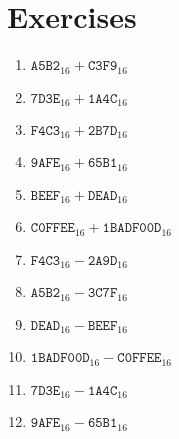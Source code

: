 \documentclass[11pt,a4paper]{article}
\theoremstyle{definition}
\theoremstyle{remark}
\begin{document}
\section{Exercises}
\begin{enumerate}
	\item $\texttt{A5B2}_{16} + \texttt{C3F9}_{16}$
	\item $\texttt{7D3E}_{16} + \texttt{1A4C}_{16}$
	\item $\texttt{F4C3}_{16} + \texttt{2B7D}_{16}$
	\item $\texttt{9AFE}_{16} + \texttt{65B1}_{16}$
	\item $\texttt{BEEF}_{16} + \texttt{DEAD}_{16}$
	\item $\texttt{C0FFEE}_{16} + \texttt{1BADF00D}_{16}$
	\item $\texttt{F4C3}_{16} - \texttt{2A9D}_{16}$
	\item $\texttt{A5B2}_{16} - \texttt{3C7F}_{16}$
	\item $\texttt{DEAD}_{16} - \texttt{BEEF}_{16}$
	\item $\texttt{1BADF00D}_{16} - \texttt{C0FFEE}_{16}$
	\item $\texttt{7D3E}_{16} - \texttt{1A4C}_{16}$
	\item $\texttt{9AFE}_{16} - \texttt{65B1}_{16}$
\end{enumerate}
\end{document}
